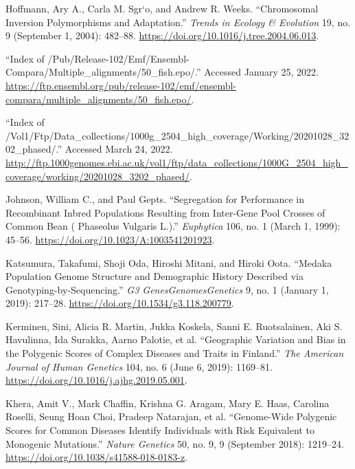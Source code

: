 \documentclass[
  9pt,
]{book}
\newlength{\cslhangindent}
\newlength{\cslentryspacingunit} %
\newenvironment{CSLReferences}[2] %
 {%
  \setlength{\parindent}{0pt}
  \ifodd #1
  \let\oldpar\par
  \def\par{\hangindent=\cslhangindent\oldpar}
  \fi
  \setlength{\parskip}{#2\cslentryspacingunit}
 }%
 {}
\begin{document}
\begin{CSLReferences}{1}{0}
\leavevmode{}%
Hoffmann, Ary A., Carla M. Sgr`o, and Andrew R. Weeks. {``Chromosomal Inversion Polymorphisms and Adaptation.''} \emph{Trends in Ecology \& Evolution} 19, no. 9 (September 1, 2004): 482--88. \url{https://doi.org/10.1016/j.tree.2004.06.013}.

\leavevmode{}%
{``Index of /Pub/Release-102/Emf/Ensembl-Compara/Multiple\_alignments/50\_fish.epo/.''} Accessed January 25, 2022. \url{https://ftp.ensembl.org/pub/release-102/emf/ensembl-compara/multiple_alignments/50_fish.epo/}.

\leavevmode{}%
{``Index of /Vol1/Ftp/Data\_collections/{1000g}\_2504\_high\_coverage/Working/20201028\_3202\_phased/.''} Accessed March 24, 2022. \url{http://ftp.1000genomes.ebi.ac.uk/vol1/ftp/data_collections/1000G_2504_high_coverage/working/20201028_3202_phased/}.

\leavevmode{}%
Johnson, William C., and Paul Gepts. {``Segregation for Performance in Recombinant Inbred Populations Resulting from Inter-Gene Pool Crosses of Common Bean ( {Phaseolus} Vulgaris {L}.).''} \emph{Euphytica} 106, no. 1 (March 1, 1999): 45--56. \url{https://doi.org/10.1023/A:1003541201923}.

\leavevmode{}%
Katsumura, Takafumi, Shoji Oda, Hiroshi Mitani, and Hiroki Oota. {``Medaka {Population Genome Structure} and {Demographic History Described} via {Genotyping-by-Sequencing}.''} \emph{G3 Genes\textbar Genomes\textbar Genetics} 9, no. 1 (January 1, 2019): 217--28. \url{https://doi.org/10.1534/g3.118.200779}.

\leavevmode{}%
Kerminen, Sini, Alicia R. Martin, Jukka Koskela, Sanni E. Ruotsalainen, Aki S. Havulinna, Ida Surakka, Aarno Palotie, et al. {``Geographic {Variation} and {Bias} in the {Polygenic Scores} of {Complex Diseases} and {Traits} in {Finland}.''} \emph{The American Journal of Human Genetics} 104, no. 6 (June 6, 2019): 1169--81. \url{https://doi.org/10.1016/j.ajhg.2019.05.001}.

\leavevmode{}%
Khera, Amit V., Mark Chaffin, Krishna G. Aragam, Mary E. Haas, Carolina Roselli, Seung Hoan Choi, Pradeep Natarajan, et al. {``Genome-Wide Polygenic Scores for Common Diseases Identify Individuals with Risk Equivalent to Monogenic Mutations.''} \emph{Nature Genetics} 50, no. 9, 9 (September 2018): 1219--24. \url{https://doi.org/10.1038/s41588-018-0183-z}.


\end{CSLReferences}
\end{document}
